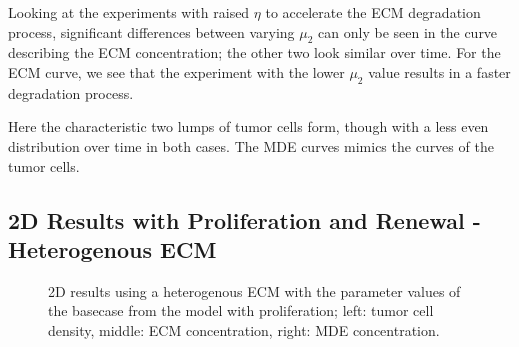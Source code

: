 Looking at the experiments with raised $\eta$ to accelerate the ECM degradation process, significant differences between varying $\mu_2$ can only be seen in the curve describing the ECM concentration; the other two look similar over time. For the ECM curve, we see that the experiment with the lower $\mu_2$ value results in a faster degradation process. 

Here the characteristic two lumps of tumor cells form, though with a less even distribution over time in both cases. The MDE curves mimics the curves of the tumor cells.



\subsection{2D Results with Proliferation and Renewal - Heterogenous ECM}
\label{sec:2D_heterogenous_ECM}
\begin{figure}[h!]
 \centering
 \caption{2D results using a heterogenous ECM with the parameter values of the basecase from the model with proliferation; left: tumor cell density, middle: ECM concentration, right: MDE concentration.}
 \label{fig:2D_heterogenous_ECM}
\end{figure}

